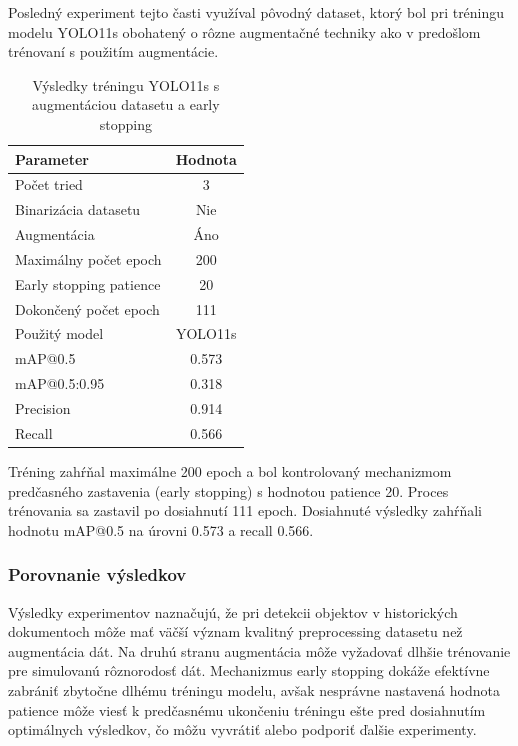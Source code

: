                Posledný experiment tejto časti využíval pôvodný dataset, ktorý bol pri tréningu modelu YOLO11s obohatený o rôzne augmentačné techniky ako v predošlom trénovaní s použitím augmentácie.

                \begin{table}[H]
                    \centering
                    \begin{tabular}{|l|c|}
                    \hline
                    \textbf{Parameter} & \textbf{Hodnota} \\ \hline
                    Počet tried & 3 \\ \hline
                    Binarizácia datasetu & Nie \\ \hline
                    Augmentácia & Áno \\ \hline
                    Maximálny počet epoch & 200 \\ \hline
                    Early stopping patience & 20 \\ \hline
                    Dokončený počet epoch & 111 \\ \hline
                    Použitý model & YOLO11s \\ \hline
                    mAP@0.5 & 0.573 \\ \hline
                    mAP@0.5:0.95 & 0.318 \\ \hline
                    Precision & 0.914 \\ \hline
                    Recall & 0.566 \\ \hline
                    \end{tabular}
                    \caption{Výsledky tréningu YOLO11s s augmentáciou datasetu a early stopping}
                    \label{tab:yolo11s_augmented_earlystop_20p}
                \end{table}

                Tréning zahŕňal maximálne 200 epoch a bol kontrolovaný mechanizmom predčasného zastavenia (early stopping) s hodnotou patience 20. Proces trénovania sa zastavil po dosiahnutí 111 epoch. Dosiahnuté výsledky zahŕňali hodnotu mAP@0.5 na úrovni 0.573 a recall 0.566.

                \subsubsection{Porovnanie výsledkov}

                Výsledky experimentov naznačujú, že pri detekcii objektov v historických dokumentoch môže mať väčší význam kvalitný preprocessing datasetu než augmentácia dát. Na druhú stranu augmentácia môže vyžadovať dlhšie trénovanie pre simulovanú rôznorodosť dát. Mechanizmus early stopping dokáže efektívne zabrániť zbytočne dlhému tréningu modelu, avšak nesprávne nastavená hodnota patience môže viesť k predčasnému ukončeniu tréningu ešte pred dosiahnutím optimálnych výsledkov, čo môžu vyvrátiť alebo podporiť ďalšie experimenty.

